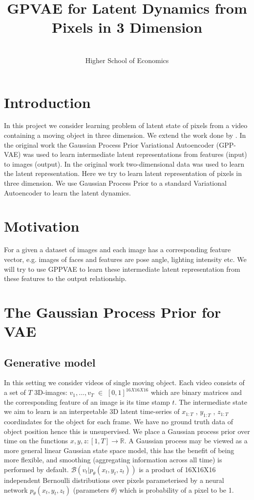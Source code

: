 \documentclass{jmlr} %
\title[GP-VAE for Latent Dynamics in 3D]{GPVAE for Latent Dynamics from Pixels in 3 Dimension}
\author{\Name{Bhupendra Dubey}\\
  \addr Higher School of Economics}
\begin{document}
\maketitle
\section{Introduction}
\label{sec:intro}
 In this project we consider learning problem of latent state of pixels from a video containing a moving object in three dimension. We extend the work done by \citep{pearce19}. In the original work the Gaussian
Process Prior Variational Autoencoder (GPP-VAE) was used to learn intermediate latent representations from features (input) to images (output). In the original work two-dimensional data was used to learn the latent representation. Here we try to learn latent representation of pixels in three dimension. We use Gaussian Process Prior to a standard Variational Autoencoder to learn the latent dynamics.

\section{Motivation}
For a given a dataset of images and each image has a corresponding feature vector,
e.g. images of faces and features are pose angle, lighting intensity etc. We will try to use GPPVAE to learn these intermediate latent representation from these features to the output relationship.


\section{The Gaussian Process Prior for VAE}

\subsection{Generative model}
In this setting we consider videos of single moving object. Each video consists of a set of $T$ 3D-images: $v_1, ..., v_T$ $\in$ $[0, 1]^{16X16X16}$ which are binary
matrices and the corresponding feature of an image is its time stamp $t$. The intermediate
state we aim to learn is an interpretable 3D latent time-series of $x_{1:T}$ , $y_{1:T}$ , $z_{1:T}$ coordindates for
the object for each frame. We have no ground truth data of object position hence this is
unsupervised. We place a Gaussian process prior over time on the functions $x, y, z : [1, T] \to \mathbb{R}$. 
A Gaussian process may be viewed as a more general linear Gaussian state space model,
this has the benefit of being more flexible, and smoothing (aggregating information across
all time) is performed by default.  $\mathcal{B}(v_t|p_{\theta}(x_t,y_t,z_t))$ is a product of 16X16X16 independent Bernoulli distributions over pixels
parameterised by a neural network  $p_{\theta}(x_t,y_t,z_t)$ (parameters $\theta$) which is probability of a pixel to be 1. 
\end{document}
